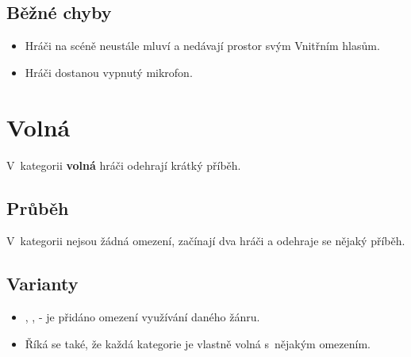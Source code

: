 \subsection{ Běžné chyby } \begin{itemize}
\item Hráči na scéně neustále mluví a nedávají prostor svým Vnitřním hlasům.
\item Hráči dostanou vypnutý mikrofon.
\end{itemize}
 
 
 
 
\needspace{5cm} \section{Volná} \label{volná}  
V~kategorii \textbf{volná}  hráči odehrají krátký příběh. 
 
\subsection{Průběh} V~kategorii nejsou žádná omezení, začínají dva hráči a odehraje se nějaký příběh. 
 
\subsection{Varianty} \begin{itemize}
\item {}, ,  - je přidáno omezení využívání daného žánru.
\item  Říká se také, že každá kategorie je vlastně volná s~nějakým omezením.
\end{itemize}
 
 
 
